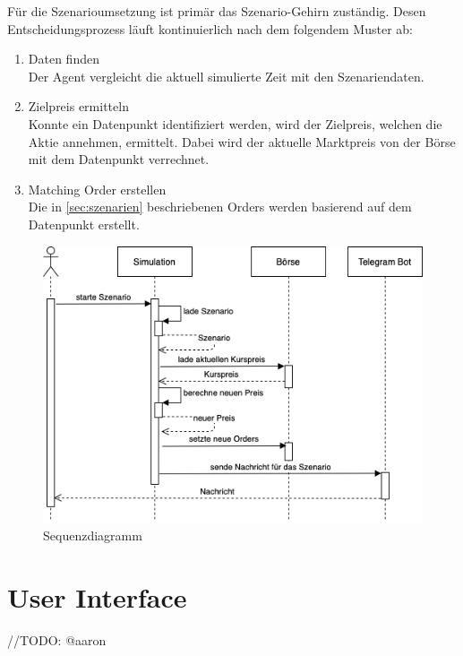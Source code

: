 Für die Szenarioumsetzung ist primär das Szenario-Gehirn zuständig. Desen Entscheidungsprozess läuft kontinuierlich nach dem folgendem Muster ab:
\begin{enumerate}
    \item Daten finden\\
        Der Agent vergleicht die aktuell simulierte Zeit mit den Szenariendaten.
    \item Zielpreis ermitteln\\
        Konnte ein Datenpunkt identifiziert werden, wird der Zielpreis, welchen die Aktie annehmen, ermittelt. Dabei wird der aktuelle Marktpreis von der Börse mit dem Datenpunkt verrechnet.
    \item Matching Order erstellen\\
        Die in \autoref{sec:szenarien} beschriebenen Orders werden basierend auf dem Datenpunkt erstellt.
\end{enumerate}

\begin{figure}[ht]
    \includegraphics[width=\textwidth]{img/Sequenzdiagramm.png}
    \centering
    \caption{Sequenzdiagramm}
    \label{fig:Sequenzdiagramm}
\end{figure}


\section{User Interface}
//TODO: @aaron
